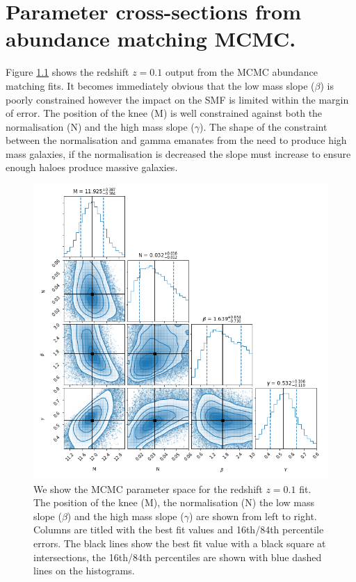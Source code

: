 \chapter{Parameter cross-sections from abundance matching MCMC.}

\label{Appx:AbnMCMC}

Figure \ref{fig:MCMC_lz} shows the redshift $z = 0.1$ output from the MCMC abundance matching fits. It becomes immediately obvious that the low mass slope ($\beta$) is poorly constrained however the impact on the SMF is limited within the margin of error. The position of the knee (M) is well constrained against both the normalisation (N) and the high mass slope ($\gamma$). The shape of the constraint between the normalisation and gamma emanates from the need to produce high mass galaxies, if the normalisation is decreased the slope must increase to ensure enough haloes produce massive galaxies.

\begin{figure}
	\centering
	\includegraphics[width = \linewidth]{Appendices/AbnMCMC/MCMC_plot_lz.png}
    \caption{We show the MCMC parameter space for the redshift $z = 0.1$ fit. The position of the knee (M), the normalisation (N) the low mass slope ($\beta$) and the high mass slope ($\gamma$) are shown from left to right. Columns are titled with the best fit values and 16th/84th percentile errors. The black lines show the best fit value with a black square at intersections, the 16th/84th percentiles are shown with blue dashed lines on the histograms.}
	\label{fig:MCMC_lz}
\end{figure}

